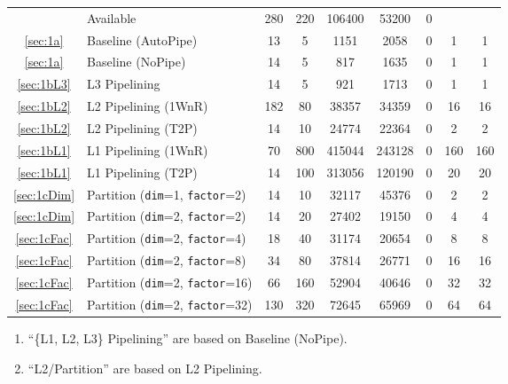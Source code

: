 {\begin{tabularx}{\textwidth}{cl*{7}{C}}
    \midrule
                                  & Available & 280 & 220 & 106400 & 53200 & 0 &  & \\
    \ref{sec:1a}                      & Baseline (AutoPipe) & 13 & 5 & 1151 & 2058 & 0 & 1 & 1 \\
\ref{sec:1a}       & Baseline (NoPipe) & 14 & 5 & 817 & 1635 & 0 & 1 & 1 \\
\ref{sec:1bL3}                          & L3 Pipelining & 14 & 5 & 921 & 1713 & 0 & 1 & 1 \\
\ref{sec:1bL2}                     & L2 Pipelining (1WnR) & 182 & 80 & 38357 & 34359 & 0 & 16 & 16 \\
\ref{sec:1bL2}     & L2 Pipelining (T2P) & 14 & 10 & 24774 & 22364 & 0 & 2 & 2 \\
\ref{sec:1bL1}                     & L1 Pipelining (1WnR) & 70 & 800 & 415044 & 243128 & 0 & 160 & 160 \\
\ref{sec:1bL1}                      & L1 Pipelining (T2P) & 14 & 100 & 313056 & 120190 & 0 & 20 & 20 \\
\ref{sec:1cDim}                     & Partition (\texttt{dim}=1, \texttt{factor}=2) & 14 & 10 & 32117 & 45376 & 0 & 2 & 2 \\
\ref{sec:1cDim}    & Partition (\texttt{dim}=2, \texttt{factor}=2) & 14 & 20 & 27402 & 19150 & 0 & 4 & 4 \\
\ref{sec:1cFac}                     & Partition (\texttt{dim}=2, \texttt{factor}=4) & 18 & 40 & 31174 & 20654 & 0 & 8 & 8 \\
\ref{sec:1cFac}                     & Partition (\texttt{dim}=2, \texttt{factor}=8) & 34 & 80 & 37814 & 26771 & 0 & 16 & 16 \\
\ref{sec:1cFac}   & Partition (\texttt{dim}=2, \texttt{factor}=16) & 66 & 160 & 52904 & 40646 & 0 & 32 & 32 \\
\ref{sec:1cFac}                    & Partition (\texttt{dim}=2, \texttt{factor}=32) & 130 & 320 & 72645 & 65969 & 0 & 64 & 64 \\
    \bottomrule
\end{tabularx}
}

\begin{enumerate}[nosep]
    \footnotesize
    \item ``\{L1, L2, L3\} Pipelining'' are based on Baseline (NoPipe).
    \item ``L2/Partition'' are based on L2 Pipelining.
\end{enumerate}